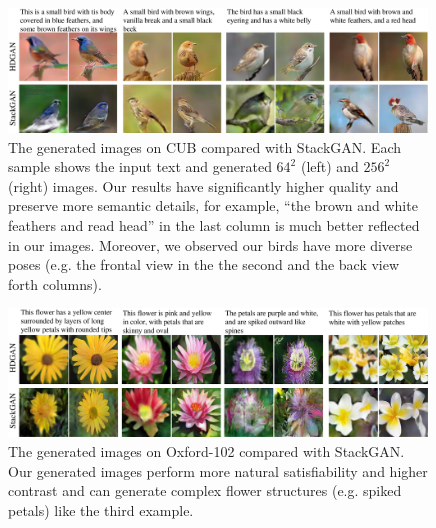 \documentclass[10pt,twocolumn,letterpaper]{article}
\begin{document}
\begin{figure}[t]
	\centering
	\includegraphics[width=0.99\textwidth]{figure/cub.pdf}
	\vspace{-.2cm}
	\caption{The generated images on CUB compared with StackGAN. Each sample shows the input text and generated $64^2$ (left) and $256^2$ (right) images. Our results have significantly higher quality and preserve more semantic details, for example, ``the brown and white feathers and read head'' in the last column is much better reflected in our images. Moreover, we observed our birds have more diverse poses (e.g. the frontal view in the the second and the back view forth columns).}
	\vspace{-0.2cm}
	\label{fig:vis-cub}
\end{figure}
\begin{figure}[t]
	\centering
	\includegraphics[width=0.99\textwidth]{figure/flowers.pdf}
	\vspace{-.2cm}
	\caption{The generated images on Oxford-102 compared with StackGAN. Our generated images perform more natural satisfiability and higher contrast and can generate complex flower structures (e.g. spiked petals) like the third example.} \label{fig:vis-oxford}
	\vspace{-.2cm}
\end{figure}
\end{document}
